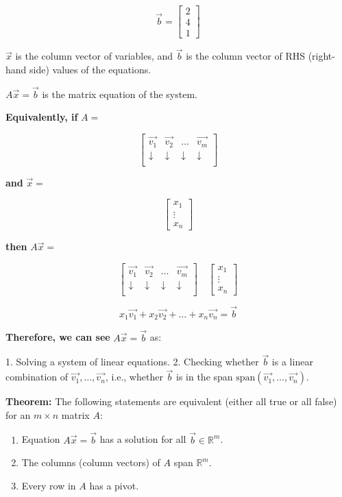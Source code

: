 \documentclass{article}
\begin{document}
\[
\vec{b} = \begin{bmatrix}
2 \\
4 \\
1
\end{bmatrix}
\]

\(\vec{x}\) is the column vector of variables, and \(\vec{b}\) is the column vector of RHS (right-hand side) values of the equations.

\(A\vec{x} = \vec{b}\) is the matrix equation of the system.


\textbf{Equivalently, if} \( A = \)

\[
\begin{bmatrix}
    \vec{v_1} & \vec{v_2} & \ldots & \vec{v_m} \\
    \downarrow & \downarrow & \downarrow & \downarrow \\
\end{bmatrix}
\]

\textbf{and} \(\vec{x} = \)

\[
\begin{bmatrix}
    x_1 \\
    \vdots \\
    x_n
\end{bmatrix}
\]

\textbf{then} \( A\vec{x} = \)

\[
\begin{bmatrix}
    \vec{v_1} & \vec{v_2} & \ldots & \vec{v_m} \\
    \downarrow & \downarrow & \downarrow & \downarrow \\
\end{bmatrix}
\quad
\begin{bmatrix}
    x_1 \\
    \vdots \\
    x_n
\end{bmatrix}
\]

\[ x_1\vec{v_1} + x_2\vec{v_2} + \ldots + x_n\vec{v_n} = \vec{b} \]

\textbf{Therefore, we can see} \( A\vec{x} = \vec{b} \) as:

1. Solving a system of linear equations.
2. Checking whether \(\vec{b}\) is a linear combination of \(\vec{v_1}, \ldots, \vec{v_n}\), i.e., whether \(\vec{b}\) is in the span \(\text{span}(\vec{v_1}, \ldots, \vec{v_n})\).


\textbf{Theorem:} The following statements are equivalent (either all true or all false) for an \(m \times n\) matrix \(A\):

\begin{enumerate}
    \item Equation \(A\vec{x} = \vec{b}\) has a solution for all \(\vec{b} \in \mathbb{R}^m\).
    \item The columns (column vectors) of \(A\) span \(\mathbb{R}^m\).
    \item Every row in \(A\) has a pivot.
\end{enumerate}
\end{document}
